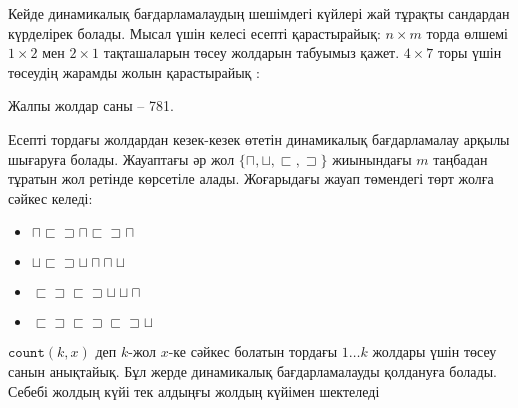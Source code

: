Кейде динамикалық бағдарламалаудың шешімдегі күйлері 
жай тұрақты сандардан күрделірек болады. Мысал үшін  келесі
есепті қарастырайық:
$n \times m$ торда өлшемі $1 \times 2$ мен $2 \times 1$ 
тақташаларын төсеу жолдарын табуымыз қажет.
$4 \times 7$ торы үшін төсеудің жарамды жолын
 қарастырайық :
\begin{center}
\end{center}
Жалпы жолдар саны -- 781.

Есепті тордағы жолдардан кезек-кезек өтетін 
динамикалық бағдарламалау арқылы шығаруға болады. 
Жауаптағы әр жол $\{\sqcap, \sqcup, \sqsubset, \sqsupset \}$
жиынындағы $m$ таңбадан тұратын жол ретінде көрсетіле алады. 
Жоғарыдағы жауап төмендегі төрт жолға
сәйкес келеді:
\begin{itemize}
\item
$\sqcap \sqsubset \sqsupset \sqcap \sqsubset \sqsupset \sqcap$
\item
$\sqcup \sqsubset \sqsupset \sqcup \sqcap \sqcap \sqcup$
\item
$\sqsubset \sqsupset \sqsubset \sqsupset \sqcup \sqcup \sqcap$ 
\item
$\sqsubset \sqsupset \sqsubset \sqsupset \sqsubset \sqsupset \sqcup$
\end{itemize}


$\texttt{count}(k,x)$ деп
$k$-жол $x$-ке сәйкес болатын
тордағы $1 \ldots k$ жолдары үшін
төсеу санын анықтайық.
Бұл жерде динамикалық бағдарламалауды қолдануға 
болады. Себебі жолдың күйі 
тек алдыңғы жолдың күйімен шектеледі


